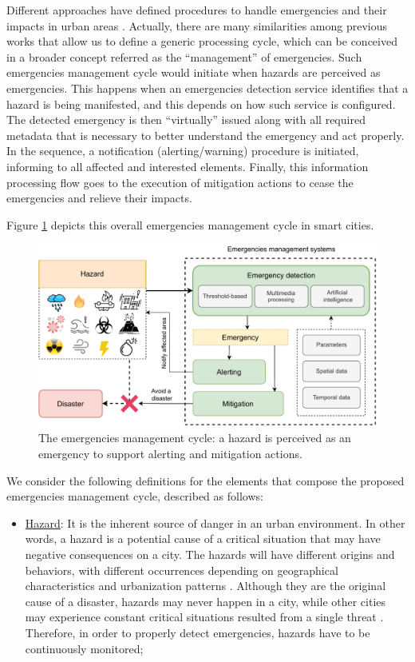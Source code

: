 \begin{refsection}
Different approaches have defined procedures to handle emergencies and their impacts in urban areas \cite{citiesemergencies1,citiesdisasters1,emergenciesmetric2,mobilityEmergencies1,kumar2017emergency}. Actually, there are many similarities among previous works that allow us to define a generic processing cycle, which can be conceived in a broader concept referred as the ``management'' of emergencies. Such emergencies management cycle would initiate when hazards are perceived as emergencies. This happens when an emergencies detection service identifies that a hazard is being manifested, and this depends on how such service is configured. The detected emergency is then ``virtually'' issued along with all required metadata that is necessary to better understand the emergency and act properly. In the sequence, a notification (alerting/warning) procedure is initiated, informing to all affected and interested elements. Finally, this information processing flow goes to the execution of mitigation actions to cease the emergencies and relieve their impacts. 

Figure \ref{Fig:cycle} depicts this overall emergencies management cycle in smart cities. 

\begin{figure}[htbp]
\centering
\includegraphics[scale=0.85]{Chapters/1-Survey/images/newcycle.pdf}
\caption{The emergencies management cycle: a hazard is perceived as an emergency to support alerting and mitigation actions.}
\label{Fig:cycle}
\end{figure}

We consider the following definitions for the elements that compose the proposed emergencies management cycle, described as follows:

\begin{itemize}
    \item \underline{Hazard}: It is the inherent source of danger in an urban environment. In other words, a hazard is a potential cause of a critical situation that may have negative consequences on a city. The hazards will have different origins and behaviors, with different occurrences depending on geographical characteristics and urbanization patterns \cite{hazard1,hazard2}. Although they are the original cause of a disaster, hazards may never happen in a city, while other cities may experience constant critical situations resulted from a single threat \cite{hazard3}. Therefore, in order to properly detect emergencies, hazards have to be continuously monitored;
    

\end{itemize}
\end{refsection}
